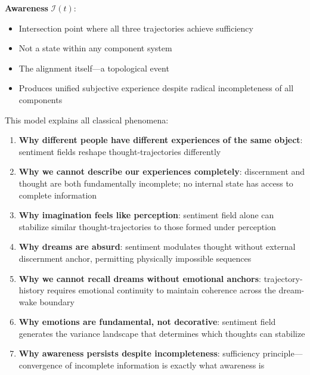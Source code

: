 \begin{principle}
\textbf{Awareness} $\mathcal{I}(t)$:
\begin{itemize}
\item Intersection point where all three trajectories achieve sufficiency
\item Not a state within any component system
\item The alignment itself—a topological event
\item Produces unified subjective experience despite radical incompleteness of all components
\end{itemize}
\end{principle}

\begin{corollary}
This model explains all classical phenomena:

\begin{enumerate}[label=(\arabic*),leftmargin=*]
\item \textbf{Why different people have different experiences of the same object}: sentiment fields reshape thought-trajectories differently

\item \textbf{Why we cannot describe our experiences completely}: discernment and thought are both fundamentally incomplete; no internal state has access to complete information

\item \textbf{Why imagination feels like perception}: sentiment field alone can stabilize similar thought-trajectories to those formed under perception

\item \textbf{Why dreams are absurd}: sentiment modulates thought without external discernment anchor, permitting physically impossible sequences

\item \textbf{Why we cannot recall dreams without emotional anchors}: trajectory-history requires emotional continuity to maintain coherence across the dream-wake boundary

\item \textbf{Why emotions are fundamental, not decorative}: sentiment field generates the variance landscape that determines which thoughts can stabilize

\item \textbf{Why awareness persists despite incompleteness}: sufficiency principle—convergence of incomplete information is exactly what awareness is
\end{enumerate}
\end{corollary}

